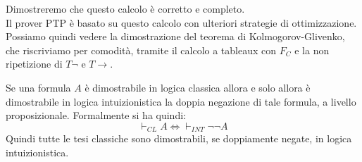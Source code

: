 \documentclass[a4paper,12pt, oneside]{book}
\begin{document}
Dimostreremo che questo calcolo è corretto e completo.\\
Il prover PTP è basato su questo calcolo con ulteriori strategie di
ottimizzazione. \\
Possiamo quindi vedere la dimostrazione del teorema di Kolmogorov-Glivenko, che
riscriviamo per comodità, tramite il calcolo a tableaux con $F_C$ e la non
ripetizione di $T\neg$ e $T\to$.
\begin{teorema}
  Se una formula $A$ è dimostrabile in logica classica allora e solo allora è
  dimostrabile in logica intuizionistica la doppia negazione di tale formula, a
  livello proposizionale. Formalmente si ha quindi:
  \[\vdash_{CL} A \iff \vdash_{INT}\neg\neg A\]
  Quindi tutte le tesi classiche sono dimostrabili, se doppiamente negate, in
  logica intuizionistica.
\end{teorema}
\end{document}
